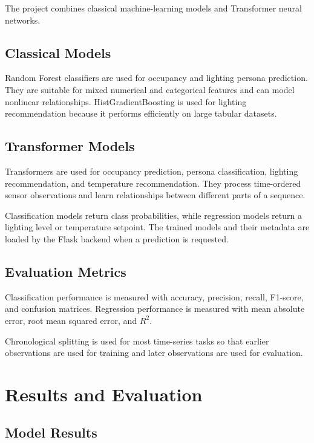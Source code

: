 The project combines classical machine-learning models and Transformer neural
networks.

\section{Classical Models}

Random Forest classifiers are used for occupancy and lighting persona
prediction. They are suitable for mixed numerical and categorical features and
can model nonlinear relationships. HistGradientBoosting is used for lighting
recommendation because it performs efficiently on large tabular datasets.

\section{Transformer Models}

Transformers are used for occupancy prediction, persona classification,
lighting recommendation, and temperature recommendation. They process
time-ordered sensor observations and learn relationships between different
parts of a sequence.

Classification models return class probabilities, while regression models
return a lighting level or temperature setpoint. The trained models and their
metadata are loaded by the Flask backend when a prediction is requested.

\section{Evaluation Metrics}

Classification performance is measured with accuracy, precision, recall,
F1-score, and confusion matrices. Regression performance is measured with
mean absolute error, root mean squared error, and $R^2$.

Chronological splitting is used for most time-series tasks so that earlier
observations are used for training and later observations are used for
evaluation.


\chapter{Results and Evaluation}
\label{chap:results}

\section{Model Results}

